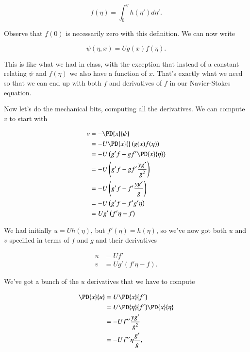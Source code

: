 \begin{equation}\label{eqn:continuumL19:850}
f(\eta) = \int_0^\eta h(\eta') d\eta'.
\end{equation}

Observe that $f(0)$ is necessarily zero with this definition.  We can now write

\begin{equation}\label{eqn:continuumL19:870}
\psi(\eta, x) = U g(x) f(\eta).
\end{equation}

This is like what we had in class, with the exception that instead of a constant relating $\psi$ and $f(\eta)$ we also have a function of $x$.  That's exactly what we need so that we can end up with both $f$ and derivatives of $f$ in our Navier-Stokes equation.  

Now let's do the mechanical bits, computing all the derivatives.  We can compute $v$ to start with

\begin{align*}
v 
&= -\PD{x}{\psi} \\
&= - U \PD{x}{} \left( g(x) f(\eta) \right) \\
&= - U \left( g' f + g f' \PD{x}{\eta} \right) \\
&= - U \left( g' f - g f' \frac{y g'}{g^2} \right) \\
&= - U \left( g' f - f' \frac{y g'}{g} \right) \\
&= - U \left( g' f - f' g' \eta \right) \\
&= U g' \left( f' \eta - f \right)
\end{align*}

We had initially $u = U h(\eta)$, but $f'(\eta) = h(\eta)$, so we've now got both $u$ and $v$ specified in terms of $f$ and $g$ and their derivatives

\begin{align}\label{eqn:continuumL19:890}
u &= U f' \\
v &= U g' \left( f' \eta - f \right).
\end{align}

We've got a bunch of the $u$ derivatives that we have to compute

\begin{align*}
\PD{x}{u} 
&=
U \PD{x}{ f' } \\
&=
U \PD{\eta}{ f' } \PD{x}{\eta} \\
&=
-U f'' \frac{y g'}{g^2} \\
&=
-U f'' \eta \frac{g'}{g},
\end{align*}

